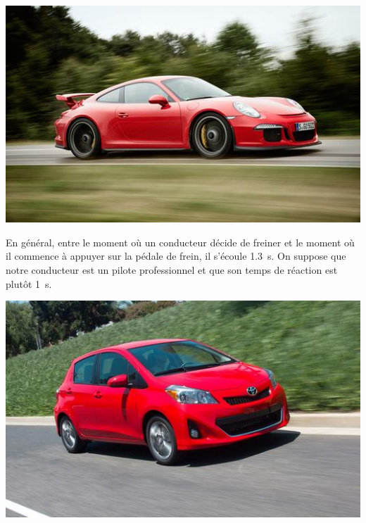 \begin{marginfigure}
  \includegraphics[scale=0.3]{03_Cinematique/2014porsche911gt3.jpg}
  \caption{Une Porsche 911 GT3 2014 peut freiner avec une accélération de
    module \SI{11.9}{\meter\per\second\squared}.}
  \label{fig:porsche}
\end{marginfigure}

En général, entre le moment où un conducteur décide de freiner et le moment où
il commence à appuyer sur la pédale de frein, il s'écoule \SI{1.3}{\second}.
On suppose que notre conducteur est un pilote professionnel et que son temps de
réaction est plutôt \SI{1}{s}.

\begin{marginfigure}
  \includegraphics[scale=0.3]{03_Cinematique/2012toyota_yaris.jpg}
  \caption{Une Toyota Yaris 2012 peut freiner avec une accélération de
    module \SI{9.29}{\meter\per\second\squared}.  Les modèles plus lourds,
    comme la Prius V 2013 n'atteignent que des accélérations de module
    \SI{8.41}{\meter\per\second\squared}.}
  \label{fig:porsche}
\end{marginfigure}

